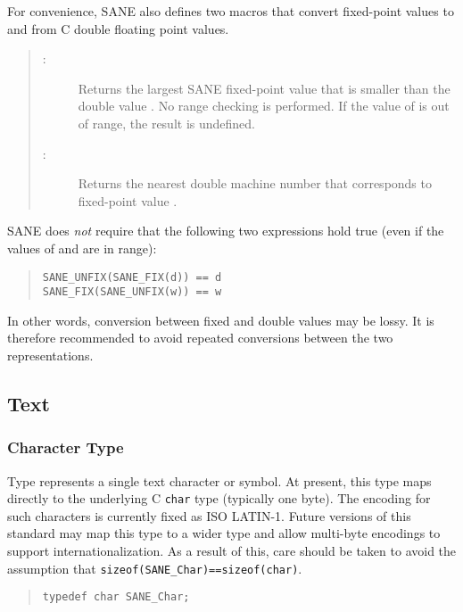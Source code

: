 \documentclass[11pt,DVIps]{report}
\begin{document}
For convenience, SANE also defines two macros that convert fixed-point
values to and from C double floating point values.
\begin{quote}
  \begin{description}

  \item[:] Returns the largest SANE
    fixed-point value that is smaller than the double value .
    No range checking is performed.  If the value of  is out of
    range, the result is undefined.

  \item[:] Returns the nearest
    double machine number that corresponds to fixed-point value
    .

  \end{description}
\end{quote}
SANE does {\em not\/} require that the following two expressions hold
true (even if the values of  and  are in range):
\begin{quote}
\begin{verbatim}
SANE_UNFIX(SANE_FIX(d)) == d
SANE_FIX(SANE_UNFIX(w)) == w
\end{verbatim}
\end{quote}
In other words, conversion between fixed and double values may be
lossy.  It is therefore recommended to avoid repeated conversions
between the two representations.


\subsection{Text}

\subsubsection{Character Type}

Type  represents a single text character or
symbol.  At present, this type maps directly to the underlying C
\verb|char| type (typically one byte).  The encoding for such
characters is currently fixed as ISO LATIN-1.  Future versions of this
standard may map this type to a wider type and allow multi-byte
encodings to support internationalization.  As a result of this, care
should be taken to avoid the assumption that
\verb|sizeof(SANE_Char)==sizeof(char)|.
\begin{quote}
\begin{verbatim}
typedef char SANE_Char;
\end{verbatim}
\end{quote}
\end{document}
